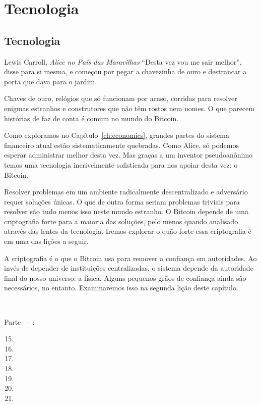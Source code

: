 \part{Tecnologia}
\label{ch:technology}
\chapter*{Tecnologia}

\begin{chapquote}{Lewis Carroll, \textit{Alice no País das Maravilhas}}
\enquote{Desta vez vou me sair melhor}, disse para si mesma, e começou por pegar a chavezinha de ouro e destrancar a porta que dava para o jardim.
\end{chapquote}

Chaves de ouro, relógios que só funcionam por acaso, corridas para resolver enigmas estranhos e construtores que não têm rostos nem nomes. O que parecem histórias de faz de conta é comum no mundo do Bitcoin.

Como exploramos no Capítulo~\ref{ch:economics}, grandes partes do sistema financeiro atual estão sistematicamente quebradas. Como Alice, só podemos esperar administrar melhor desta vez. Mas graças a um inventor pseudoanônimo temos uma tecnologia incrivelmente sofisticada para nos apoiar desta vez: o Bitcoin.

Resolver problemas em um ambiente radicalmente descentralizado e adversário requer soluções únicas. O que de outra forma seriam problemas triviais para resolver são tudo menos isso neste mundo estranho. O Bitcoin depende de uma criptografia forte para a maioria das soluções, pelo menos quando analisado através das lentes da tecnologia. Iremos explorar o quão forte essa criptografia é em uma das lições a seguir.

A criptografia é o que o Bitcoin usa para remover a confiança em autoridades. Ao invés de depender de instituições centralizadas, o sistema depende da autoridade final do nosso universo: a física. Alguns pequenos grãos de confiança ainda são necessários, no entanto. Examinaremos isso na segunda lição deste capítulo.

~

\begin{samepage}
Parte~\ref{ch:technology} -- :

\begin{enumerate}
  \setcounter{enumi}{14}
  \item {}
  \item {}
  \item {}
  \item {}
  \item {}
  \item {}
  \item {}
\end{enumerate}
\end{samepage}


